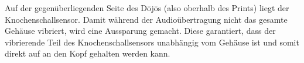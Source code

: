 Auf der gegenüberliegenden Seite des Dōjōs (also oberhalb des Prints) liegt der Knochenschallsensor. Damit während der Audioübertragung nicht das gesamte Gehäuse vibriert, wird eine Aussparung gemacht. Diese garantiert, dass der vibrierende Teil des Knochenschallsensors unabhängig vom Gehäuse ist und somit direkt auf an den Kopf gehalten werden kann.
 
